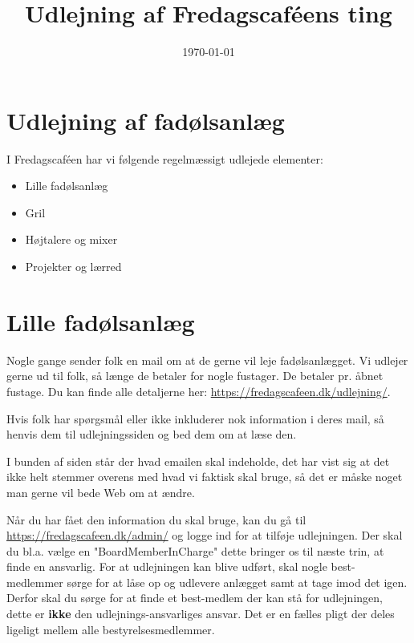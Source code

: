 

\title{Udlejning af Fredagscaféens ting}
\date{\today}



\maketitle

\section{Udlejning af fadølsanlæg}

I Fredagscaféen har vi følgende regelmæssigt udlejede elementer:
\begin{itemize}
	\item Lille fadølsanlæg
	\item Gril
	\item Højtalere og mixer
	\item Projekter og lærred
\end{itemize}

\section{Lille fadølsanlæg}
Nogle gange sender folk en mail om at de gerne vil leje fadølsanlægget. Vi udlejer gerne ud til folk, så længe de betaler for nogle fustager. De betaler pr. åbnet fustage. Du kan finde alle detaljerne her: \url{https://fredagscafeen.dk/udlejning/}.

Hvis folk har spørgsmål eller ikke inkluderer nok information i deres mail, så henvis dem til udlejningssiden og bed dem om at læse den.

I bunden af siden står der hvad emailen skal indeholde, det har vist sig at det ikke helt stemmer overens med hvad vi faktisk skal bruge, så det er måske noget man gerne vil bede Web om at ændre.

Når du har fået den information du skal bruge, kan du gå til \url{https://fredagscafeen.dk/admin/} og logge ind for at tilføje udlejningen. Der skal du bl.a. vælge en "BoardMemberInCharge" dette bringer os til næste trin, at finde en ansvarlig. For at udlejningen kan blive udført, skal nogle best-medlemmer sørge for at låse op og udlevere anlægget samt at tage imod det igen. Derfor skal du sørge for at finde et best-medlem der kan stå for udlejningen, dette er \textbf{ikke} den udlejnings-ansvarliges ansvar. Det er en fælles pligt der deles ligeligt mellem alle bestyrelsesmedlemmer.

